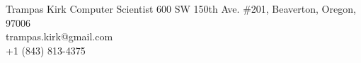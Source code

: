\documentclass[9pt]{article}
\begin{document}
%
%
%
%

\setmainfont

\header
{\LARGE Trampas Kirk}
{\Large Computer Scientist}
{\hspace{5em}\small600 SW 150th Ave. \#201, Beaverton, Oregon, 97006\\
trampas.kirk@gmail.com\\
+1 (843) 813-4375}

%
%
%
%
%
%
%
%

\end{document}
